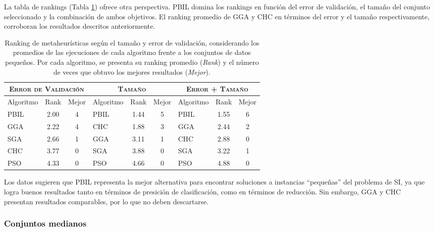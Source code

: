 La tabla de rankings (Tabla \ref{res-small-rank}) ofrece otra perspectiva. PBIL domina los rankings en función del error de validación, el tamaño del conjunto seleccionado y la combinación de ambos objetivos. El ranking promedio de GGA y CHC en términos del error y el tamaño respectivamente, corroboran los resultados descritos anteriormente.

\begin{table}[h!]
\centering
\begin{tabular}{l c c|l c c|l c c}
\hline
\multicolumn{3}{c|}{\textsc{Error de Validación}}
	& \multicolumn{3}{c|}{\textsc{Tamaño}}
	& \multicolumn{3}{c}{\textsc{Error + Tamaño}} \\
\hline
Algoritmo & Rank & Mejor & Algoritmo & Rank & Mejor & Algoritmo & Rank & Mejor \\
\hline
\hline
PBIL & 2.00 & 4 & PBIL & 1.44 & 5 & PBIL & 1.55 & 6 \\
GGA  & 2.22 & 4 & CHC  & 1.88 & 3 & GGA  & 2.44 & 2 \\
SGA  & 2.66 & 1 & GGA  & 3.11 & 1 & CHC  & 2.88 & 0 \\
CHC  & 3.77 & 0 & SGA  & 3.88 & 0 & SGA  & 3.22 & 1 \\
PSO  & 4.33 & 0 & PSO  & 4.66 & 0 & PSO  & 4.88 & 0 \\
\hline
\end{tabular}
\caption[Ranking de metaheurísticas según el tamaño y error de validación en conjuntos de datos pequeños]{Ranking de metaheurísticas según el tamaño y error de validación, considerando los promedios de las ejecuciones de cada algoritmo frente a los conjuntos de datos pequeños. Por cada algoritmo, se presenta su ranking promedio (\emph{Rank}) y el número de veces que obtuvo los mejores resultados (\emph{Mejor}).}
\label{res-small-rank}
\end{table}

Los datos sugieren que PBIL representa la mejor alternativa para encontrar soluciones a instancias ``pequeñas'' del problema de SI, ya que logra buenos resultados tanto en términos de presición de clasificación, como en términos de reducción. Sin embargo, GGA y CHC presentan resultados comparables, por lo que no deben descartarse.

\subsubsection{Conjuntos medianos}

